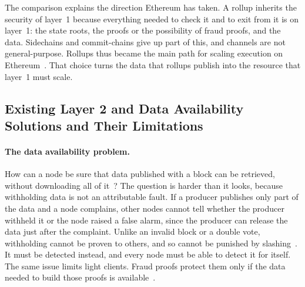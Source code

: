 The comparison explains the direction Ethereum has taken.
A rollup inherits the security of layer~1 because everything needed to check it and to exit from it is on layer~1: the state roots, the proofs or the possibility of fraud proofs, and the data.
Sidechains and commit-chains give up part of this, and channels are not general-purpose.
Rollups thus became the main path for scaling execution on Ethereum~\cite{buterin2020rollupcentric}.
That choice turns the data that rollups publish into the resource that layer~1 must scale.

\subsection{Existing Layer 2 and Data Availability Solutions and Their Limitations}\label{sec:bg:l2:limitations}


\paragraph{The data availability problem.}
How can a node be sure that data published with a block can be retrieved, without downloading all of it~\cite{albassam2021fraud}?
The question is harder than it looks, because withholding data is not an attributable fault.
If a producer publishes only part of the data and a node complains, other nodes cannot tell whether the producer withheld it or the node raised a false alarm, since the producer can release the data just after the complaint.
Unlike an invalid block or a double vote, withholding cannot be proven to others, and so cannot be punished by slashing~\cite{albassam2021fraud}.
It must be detected instead, and every node must be able to detect it for itself.
The same issue limits light clients.
Fraud proofs protect them only if the data needed to build those proofs is available~\cite{albassam2021fraud}.

